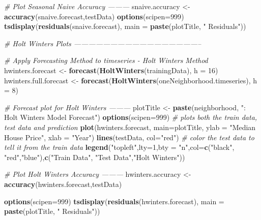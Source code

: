 \documentclass[]{article}
\newenvironment{Shaded}{\begin{snugshade}}{\end{snugshade}}
\newcommand{\KeywordTok}[1]{\textcolor[rgb]{0.13,0.29,0.53}{\textbf{#1}}}
\newcommand{\DataTypeTok}[1]{\textcolor[rgb]{0.13,0.29,0.53}{#1}}
\newcommand{\DecValTok}[1]{\textcolor[rgb]{0.00,0.00,0.81}{#1}}
\newcommand{\StringTok}[1]{\textcolor[rgb]{0.31,0.60,0.02}{#1}}
\newcommand{\CommentTok}[1]{\textcolor[rgb]{0.56,0.35,0.01}{\textit{#1}}}
\newcommand{\NormalTok}[1]{#1}
\begin{document}
\begin{Shaded}
\begin{Highlighting}[]
{  \CommentTok{# Plot Seasonal Naive Accuracy ---------}
\NormalTok{  snaive.accuracy <-}\StringTok{ }\KeywordTok{accuracy}\NormalTok{(snaive.forecast,testData)}
  \KeywordTok{options}\NormalTok{(}\DataTypeTok{scipen=}\DecValTok{999}\NormalTok{)}
  \KeywordTok{tsdisplay}\NormalTok{(}\KeywordTok{residuals}\NormalTok{(snaive.forecast), }\DataTypeTok{main =} \KeywordTok{paste}\NormalTok{(plotTitle, }\StringTok{" Residuals"}\NormalTok{))}
  
  \CommentTok{# Holt Winters Plots -----------------------------------------------------}
  
    \CommentTok{# Apply Forecasting Method to timeseries - Holt Winters Method}
\NormalTok{  hwinters.forecast <-}\StringTok{ }\KeywordTok{forecast}\NormalTok{(}\KeywordTok{HoltWinters}\NormalTok{(trainingData), }\DataTypeTok{h =} \DecValTok{16}\NormalTok{)}
\NormalTok{  hwinters.full.forecast <-}\StringTok{ }\KeywordTok{forecast}\NormalTok{(}\KeywordTok{HoltWinters}\NormalTok{(oneNeighborhood.timeseries), }\DataTypeTok{h =} \DecValTok{8}\NormalTok{)}
  
  \CommentTok{# Forecast plot for Holt Winters ---------}
\NormalTok{  plotTitle <-}\StringTok{ }\KeywordTok{paste}\NormalTok{(neighborhood, }\StringTok{": Holt Winters Model Forecast"}\NormalTok{)}
  \KeywordTok{options}\NormalTok{(}\DataTypeTok{scipen=}\DecValTok{999}\NormalTok{)}
  \CommentTok{# plots both the train data, test data and prediction}
  \KeywordTok{plot}\NormalTok{(hwinters.forecast, }\DataTypeTok{main=}\NormalTok{plotTitle, }\DataTypeTok{ylab =} \StringTok{"Median House Price"}\NormalTok{, }\DataTypeTok{xlab =} \StringTok{"Year"}\NormalTok{) }
  \KeywordTok{lines}\NormalTok{(testData, }\DataTypeTok{col=}\StringTok{"red"}\NormalTok{) }\CommentTok{# color the test data to tell it from the train data}
  \KeywordTok{legend}\NormalTok{(}\StringTok{"topleft"}\NormalTok{,}\DataTypeTok{lty=}\DecValTok{1}\NormalTok{,}\DataTypeTok{bty =} \StringTok{"n"}\NormalTok{,}\DataTypeTok{col=}\KeywordTok{c}\NormalTok{(}\StringTok{"black"}\NormalTok{, }\StringTok{"red"}\NormalTok{,}\StringTok{"blue"}\NormalTok{),}\KeywordTok{c}\NormalTok{(}\StringTok{"Train Data"}\NormalTok{, }\StringTok{"Test Data"}\NormalTok{,}\StringTok{"Holt Winters"}\NormalTok{))}

  \CommentTok{# Plot Holt Winters Accuracy ---------}
\NormalTok{  hwinters.accuracy <-}\StringTok{ }\KeywordTok{accuracy}\NormalTok{(hwinters.forecast,testData)}
  
  \KeywordTok{options}\NormalTok{(}\DataTypeTok{scipen=}\DecValTok{999}\NormalTok{)}
  \KeywordTok{tsdisplay}\NormalTok{(}\KeywordTok{residuals}\NormalTok{(hwinters.forecast), }\DataTypeTok{main =} \KeywordTok{paste}\NormalTok{(plotTitle, }\StringTok{" Residuals"}\NormalTok{))}
  

}
\end{Highlighting}
\end{Shaded}
\end{document}
